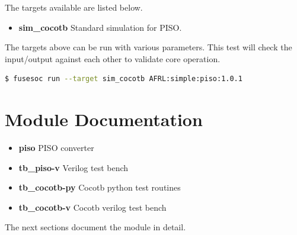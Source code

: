 The targets available are listed below.
\begin{itemize}
  \item \textbf{sim\_cocotb} Standard simulation for PISO.
\end{itemize}

The targets above can be run with various parameters.
This test will check the input/output against each other to validate core operation.
\begin{lstlisting}[language=bash]
  $ fusesoc run --target sim_cocotb AFRL:simple:piso:1.0.1
\end{lstlisting}

\newpage

\section{Module Documentation} \label{Module Documentation}

\par

\begin{itemize}
\item \textbf{piso} PISO converter\\
\item \textbf{tb\_piso-v} Verilog test bench\\
\item \textbf{tb\_cocotb-py} Cocotb python test routines\\
\item \textbf{tb\_cocotb-v} Cocotb verilog test bench\\
\end{itemize}
The next sections document the module in detail.

